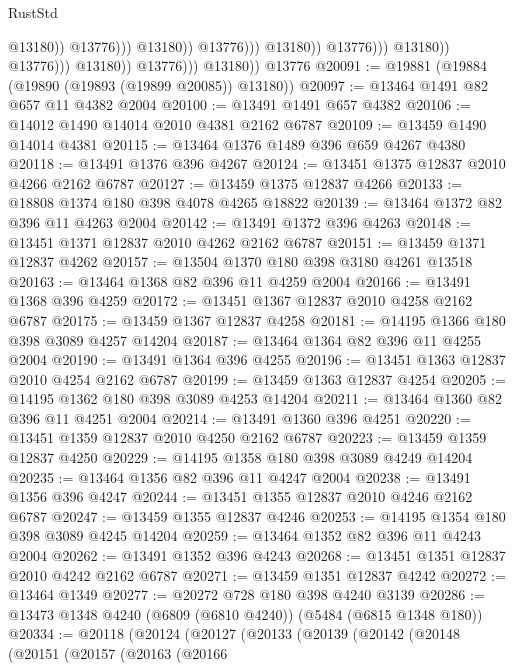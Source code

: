 \begin{lexlean}{RustStd}
\begin{coremodule}
{\begin{coremodule}
{{{{{{{{{{{{{{{{{{{{{{{{{{{{{{{                                                          @13180))
                                                      @13776)))
                                                @13180))
                                            @13776)))
                                      @13180))
                                  @13776)))
                            @13180))
                        @13776)))
                  @13180))
              @13776)))
        @13180))
    @13776
@20091 := @19881 (@19884 (@19890 (@19893 (@19899 @20085)) @13180))
@20097 := @13464 @1491 @82 @657 @11 @4382 @2004
@20100 := @13491 @1491 @657 @4382
@20106 := @14012 @1490 @14014 @2010 @4381 @2162 @6787
@20109 := @13459 @1490 @14014 @4381
@20115 := @13464 @1376 @1489 @396 @659 @4267 @4380
@20118 := @13491 @1376 @396 @4267
@20124 := @13451 @1375 @12837 @2010 @4266 @2162 @6787
@20127 := @13459 @1375 @12837 @4266
@20133 := @18808 @1374 @180 @398 @4078 @4265 @18822
@20139 := @13464 @1372 @82 @396 @11 @4263 @2004
@20142 := @13491 @1372 @396 @4263
@20148 := @13451 @1371 @12837 @2010 @4262 @2162 @6787
@20151 := @13459 @1371 @12837 @4262
@20157 := @13504 @1370 @180 @398 @3180 @4261 @13518
@20163 := @13464 @1368 @82 @396 @11 @4259 @2004
@20166 := @13491 @1368 @396 @4259
@20172 := @13451 @1367 @12837 @2010 @4258 @2162 @6787
@20175 := @13459 @1367 @12837 @4258
@20181 := @14195 @1366 @180 @398 @3089 @4257 @14204
@20187 := @13464 @1364 @82 @396 @11 @4255 @2004
@20190 := @13491 @1364 @396 @4255
@20196 := @13451 @1363 @12837 @2010 @4254 @2162 @6787
@20199 := @13459 @1363 @12837 @4254
@20205 := @14195 @1362 @180 @398 @3089 @4253 @14204
@20211 := @13464 @1360 @82 @396 @11 @4251 @2004
@20214 := @13491 @1360 @396 @4251
@20220 := @13451 @1359 @12837 @2010 @4250 @2162 @6787
@20223 := @13459 @1359 @12837 @4250
@20229 := @14195 @1358 @180 @398 @3089 @4249 @14204
@20235 := @13464 @1356 @82 @396 @11 @4247 @2004
@20238 := @13491 @1356 @396 @4247
@20244 := @13451 @1355 @12837 @2010 @4246 @2162 @6787
@20247 := @13459 @1355 @12837 @4246
@20253 := @14195 @1354 @180 @398 @3089 @4245 @14204
@20259 := @13464 @1352 @82 @396 @11 @4243 @2004
@20262 := @13491 @1352 @396 @4243
@20268 := @13451 @1351 @12837 @2010 @4242 @2162 @6787
@20271 := @13459 @1351 @12837 @4242
@20272 := @13464 @1349
@20277 := @20272 @728 @180 @398 @4240 @3139
@20286 := @13473 @1348 @4240 (@6809 (@6810 @4240)) (@5484 (@6815 @1348 @180))
@20334 := @20118
    (@20124
      (@20127
        (@20133
          (@20139
            (@20142
              (@20148
                (@20151
                  (@20157
                    (@20163
                      (@20166
}}}}}}}}}}}}}}}}}}}}}}}}}}}}}}}
\end{coremodule}}
\end{coremodule}
\end{lexlean}
